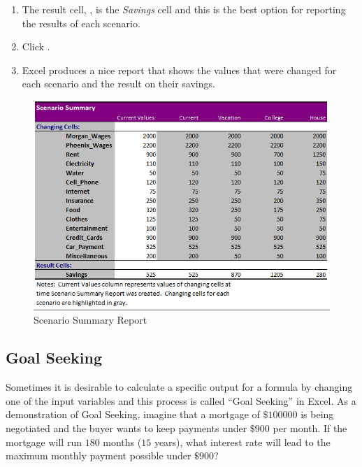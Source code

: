 \begin{enumerate}[resume]	
	
	\item The result cell, , is the \textit{Savings} cell and this is the best option for reporting the results of each scenario.
	\item Click .
	\item Excel produces a nice report that shows the values that were changed for each scenario and the result on their savings. 
\end{enumerate}

\begin{figure}[H]
	\centering
	\includegraphics[width=\maxwidth{.95\linewidth}]{gfx/ch08_fig32}
	\caption{Scenario Summary Report}
	\label{08:fig32}
\end{figure}

\subsection{Goal Seeking}

Sometimes it is desirable to calculate a specific output for a formula by changing one of the input variables and this process is called ``Goal Seeking'' in Excel. As a demonstration of Goal Seeking, imagine that a mortgage of $ \$100000 $ is being negotiated and the buyer wants to keep payments under $ \$900 $ per month. If the mortgage will run $ 180 $ months ($ 15 $ years), what interest rate will lead to the maximum monthly payment possible under $ \$900 $?

